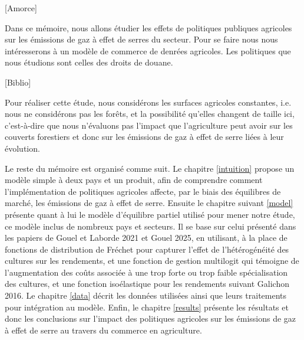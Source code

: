 [Amorce]

Dans ce mémoire, nous allons étudier les effets de politiques publiques agricoles sur les émissions de gaz à effet de serres du secteur. Pour se faire nous nous intéresserons à un modèle de commerce de denrées agricoles. Les politiques que nous étudions sont celles des droits de douane.

[Biblio]


Pour réaliser cette étude, nous considérons les surfaces agricoles constantes, i.e. nous ne considérons pas les forêts, et la possibilité qu’elles changent de taille ici, c’est-à-dire que nous n’évaluons pas l’impact que l’agriculture peut avoir sur les couverts forestiers et donc sur les émissions de gaz à effet de serre liées à leur évolution.

Le reste du mémoire est organisé comme suit. Le chapitre \ref{intuition} propose un modèle simple à deux pays et un produit, afin de comprendre comment l’implémentation de politiques agricoles affecte, par le biais des équilibres de marché, les émissions de gaz à effet de serre. Ensuite le chapitre suivant \ref{model} présente quant à lui le modèle d’équilibre partiel utilisé pour mener notre étude, ce modèle inclus de nombreux pays et secteurs. Il se base sur celui présenté dans les papiers de Gouel et Laborde 2021 et Gouel 2025, en utilisant, à la place de fonctions de distribution de Fréchet pour capturer l’effet de l’hétérogénéité des cultures sur les rendements, et une fonction de gestion multilogit qui témoigne de l’augmentation des coûts associée à une trop forte ou trop faible spécialisation des cultures, et une fonction isoélastique pour les rendements suivant Galichon 2016. Le chapitre \ref{data} décrit les données utilisées ainsi que leurs traitements pour intégration au modèle. Enfin, le chapitre \ref{results} présente les résultats et donc les conclusions sur l’impact des politiques agricoles sur les émissions de gaz à effet de serre au travers du commerce en agriculture.

